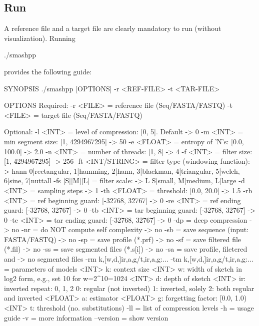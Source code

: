 \subsection{Run \smashpp}
A reference file and a target file are clearly mandatory to run \smashpp (without visualization). Running
\begin{code}[style=bash]
./smashpp
\end{code}
provides the following guide:
\begin{code}[style=bash]
SYNOPSIS
  ./smashpp [OPTIONS]  -r <REF-FILE>  -t <TAR-FILE>

OPTIONS
  Required:
  -r  <FILE>         = reference file (Seq/FASTA/FASTQ)
  -t  <FILE>         = target file    (Seq/FASTA/FASTQ)

  Optional:
  -l  <INT>          = level of compression: [0, 5]. Default -> 0
  -m  <INT>          = min segment size: [1, 4294967295]     -> 50
  -e  <FLOAT>        = entropy of 'N's: [0.0, 100.0]         -> 2.0
  -n  <INT>          = number of threads: [1, 8]             -> 4
  -f  <INT>          = filter size: [1, 4294967295]          -> 256
  -ft <INT/STRING>   = filter type (windowing function):     -> hann
                       {0|rectangular, 1|hamming, 2|hann,
                       3|blackman, 4|triangular, 5|welch,
                       6|sine, 7|nuttall}
  -fs [S][M][L]      = filter scale:                         -> L
                       {S|small, M|medium, L|large}
  -d  <INT>          = sampling steps                        -> 1
  -th <FLOAT>        = threshold: [0.0, 20.0]                -> 1.5
  -rb <INT>          = ref beginning guard: [-32768, 32767]  -> 0
  -re <INT>          = ref ending guard: [-32768, 32767]     -> 0
  -tb <INT>          = tar beginning guard: [-32768, 32767]  -> 0
  -te <INT>          = tar ending guard: [-32768, 32767]     -> 0
  -dp                = deep compression                      -> no
  -nr                = do NOT compute self complexity        -> no
  -sb                = save sequence (input: FASTA/FASTQ)    -> no
  -sp                = save profile (*.prf)                  -> no
  -sf                = save filtered file (*.fil)            -> no
  -ss                = save segmented files (*.s[i])         -> no
  -sa                = save profile, filetered and           -> no
                       segmented files
  -rm k,[w,d,]ir,a,g/t,ir,a,g:...
  -tm k,[w,d,]ir,a,g/t,ir,a,g:...
                     = parameters of models
                <INT>  k:  context size
                <INT>  w:  width of sketch in log2 form,
                           e.g., set 10 for w=2^10=1024
                <INT>  d:  depth of sketch
                <INT>  ir: inverted repeat: {0, 1, 2}
                           0: regular (not inverted)
                           1: inverted, solely
                           2: both regular and inverted
              <FLOAT>  a:  estimator
              <FLOAT>  g:  forgetting factor: [0.0, 1.0)
                <INT>  t:  threshold (no. substitutions)
  -ll                = list of compression levels
  -h                 = usage guide
  -v                 = more information
  --version          = show version
\end{code}

